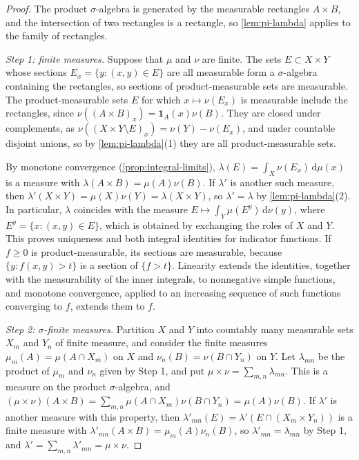 \begin{proof}
The product $\sigma$-algebra is generated by the measurable rectangles $A\times B$, and the intersection of two rectangles is a rectangle, so \cref{lem:pi-lambda} applies to the family of rectangles.

\emph{Step 1: finite measures.} Suppose that $\mu$ and $\nu$ are finite. The sets $E\subset X\times Y$ whose sections $E_x=\{y:(x,y)\in E\}$ are all measurable form a $\sigma$-algebra containing the rectangles, so sections of product-measurable sets are measurable. The product-measurable sets $E$ for which $x\mapsto\nu(E_x)$ is measurable include the rectangles, since $\nu((A\times B)_x)=\mathbf1_A(x)\nu(B)$. They are closed under complements, as $\nu((X\times Y\setminus E)_x)=\nu(Y)-\nu(E_x)$, and under countable disjoint unions, so by \cref{lem:pi-lambda}(1) they are all product-measurable sets.

By monotone convergence (\cref{prop:integral-limits}), $\lambda(E)=\int_X\nu(E_x)\,\mathrm d\mu(x)$ is a measure with $\lambda(A\times B)=\mu(A)\nu(B)$. If $\lambda'$ is another such measure, then $\lambda'(X\times Y)=\mu(X)\nu(Y)=\lambda(X\times Y)$, so $\lambda'=\lambda$ by \cref{lem:pi-lambda}(2). In particular, $\lambda$ coincides with the measure $E\mapsto\int_Y\mu(E^y)\,\mathrm d\nu(y)$, where $E^y=\{x:(x,y)\in E\}$, which is obtained by exchanging the roles of $X$ and $Y$. This proves uniqueness and both integral identities for indicator functions. If $f\geq0$ is product-measurable, its sections are measurable, because $\{y:f(x,y)>t\}$ is a section of $\{f>t\}$. Linearity extends the identities, together with the measurability of the inner integrals, to nonnegative simple functions, and monotone convergence, applied to an increasing sequence of such functions converging to $f$, extends them to $f$.

\emph{Step 2: $\sigma$-finite measures.} Partition $X$ and $Y$ into countably many measurable sets $X_m$ and $Y_n$ of finite measure, and consider the finite measures $\mu_m(A)=\mu(A\cap X_m)$ on $X$ and $\nu_n(B)=\nu(B\cap Y_n)$ on $Y$. Let $\lambda_{mn}$ be the product of $\mu_m$ and $\nu_n$ given by Step 1, and put $\mu\times\nu=\sum_{m,n}\lambda_{mn}$. This is a measure on the product $\sigma$-algebra, and $(\mu\times\nu)(A\times B)=\sum_{m,n}\mu(A\cap X_m)\nu(B\cap Y_n)=\mu(A)\nu(B)$. If $\lambda'$ is another measure with this property, then $\lambda'_{mn}(E)=\lambda'(E\cap(X_m\times Y_n))$ is a finite measure with $\lambda'_{mn}(A\times B)=\mu_m(A)\nu_n(B)$, so $\lambda'_{mn}=\lambda_{mn}$ by Step 1, and $\lambda'=\sum_{m,n}\lambda'_{mn}=\mu\times\nu$.


\end{proof}
